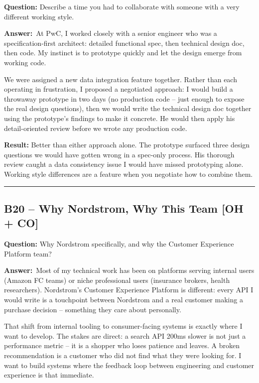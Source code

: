 \documentclass[letterpaper,10pt]{article}
\newlength{\boxwidth}
\newcommand{\bquestionbox}[1]{%
  \vspace{6pt}%
  \noindent\colorbox{bqbg}{%
    \begin{minipage}{\boxwidth}%
      \vspace{3pt}\textbf{\textcolor{orange!70!black}{Question:}} #1\vspace{3pt}%
    \end{minipage}%
  }\vspace{2pt}%
}
\newcommand{\answerlabel}{\noindent\textbf{\textcolor{answerblue}{Answer:}}~}
\begin{document}
\bquestionbox{Describe a time you had to collaborate with someone with a very different working style.}

\answerlabel At PwC, I worked closely with a senior engineer who was a specification-first architect: detailed functional spec, then technical design doc, then code. My instinct is to prototype quickly and let the design emerge from working code.

We were assigned a new data integration feature together. Rather than each operating in frustration, I proposed a negotiated approach: I would build a throwaway prototype in two days (no production code -- just enough to expose the real design questions), then we would write the technical design doc together using the prototype's findings to make it concrete. He would then apply his detail-oriented review before we wrote any production code.

\textbf{Result:} Better than either approach alone. The prototype surfaced three design questions we would have gotten wrong in a spec-only process. His thorough review caught a data consistency issue I would have missed prototyping alone. Working style differences are a feature when you negotiate how to combine them.

\rule{\linewidth}{0.2pt}

\subsection*{B20 -- Why Nordstrom, Why This Team \textmd{[OH + CO]}}

\bquestionbox{Why Nordstrom specifically, and why the Customer Experience Platform team?}

\answerlabel Most of my technical work has been on platforms serving internal users (Amazon FC teams) or niche professional users (insurance brokers, health researchers). Nordstrom's Customer Experience Platform is different: every API I would write is a touchpoint between Nordstrom and a real customer making a purchase decision -- something they care about personally.

That shift from internal tooling to consumer-facing systems is exactly where I want to develop. The stakes are direct: a search API 200ms slower is not just a performance metric -- it is a shopper who loses patience and leaves. A broken recommendation is a customer who did not find what they were looking for. I want to build systems where the feedback loop between engineering and customer experience is that immediate.
\end{document}
